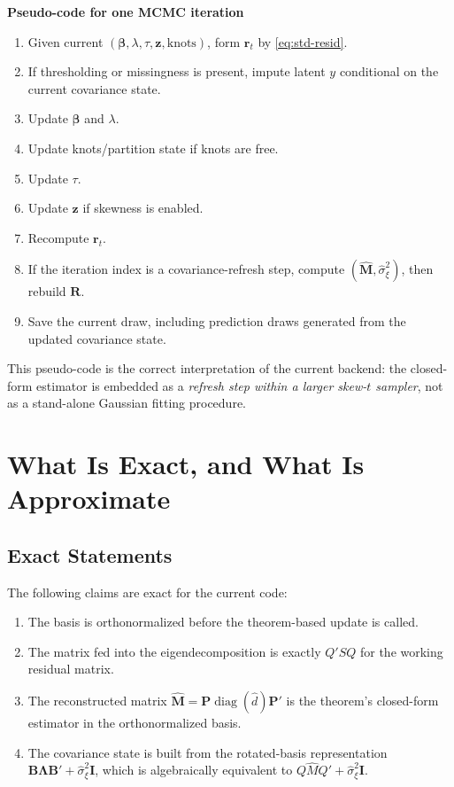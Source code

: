 \documentclass[11pt]{article}
\newcommand{\bB}{\mathbf{B}}
\newcommand{\bR}{\mathbf{R}}
\newcommand{\bM}{\mathbf{M}}
\newcommand{\bP}{\mathbf{P}}
\newcommand{\bz}{\mathbf{z}}
\newcommand{\br}{\mathbf{r}}
\newcommand{\diag}{\operatorname{diag}}
\newcommand{\I}{\mathbf{I}}
\begin{document}
\noindent\textbf{Pseudo-code for one MCMC iteration}

\begin{enumerate}[label=\arabic*.]
\item Given current \((\bm{\beta}, \lambda, \tau, \bz, \text{knots})\), form
\(\br_t\) by \eqref{eq:std-resid}.
\item If thresholding or missingness is present, impute latent \(y\) conditional
on the current covariance state.
\item Update \(\bm{\beta}\) and \(\lambda\).
\item Update knots/partition state if knots are free.
\item Update \(\tau\).
\item Update \(\bz\) if skewness is enabled.
\item Recompute \(\br_t\).
\item If the iteration index is a covariance-refresh step, compute
\((\widehat{\bM}, \widehat{\sigma}_\xi^2)\), then rebuild \(\bR\).
\item Save the current draw, including prediction draws generated from the
updated covariance state.
\end{enumerate}

This pseudo-code is the correct interpretation of the current backend:
the closed-form estimator is embedded as a \emph{refresh step within a larger
skew-$t$ sampler}, not as a stand-alone Gaussian fitting procedure.

\section{What Is Exact, and What Is Approximate}

\subsection{Exact Statements}

The following claims are exact for the current code:

\begin{enumerate}[label=\arabic*.]
\item The basis is orthonormalized before the theorem-based update is called.
\item The matrix fed into the eigendecomposition is exactly \(Q'SQ\) for the
working residual matrix.
\item The reconstructed matrix
\(\widehat{\bM} = \bP \diag(\widehat d)\bP'\) is the theorem's closed-form
estimator in the orthonormalized basis.
\item The covariance state is built from the rotated-basis representation
\(\bB \bm{\Lambda} \bB' + \widehat{\sigma}_\xi^2 \I\), which is algebraically
equivalent to \(Q \widehat M Q' + \widehat{\sigma}_\xi^2 \I\).
\end{enumerate}
\end{document}
